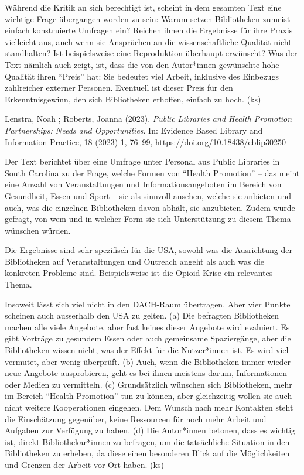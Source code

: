 \documentclass[a4paper,
fontsize=11pt,
oneside,
numbers=noperiodatend,
parskip=half-,
bibliography=totoc,
final
]{scrartcl}
\begin{document}
Während die Kritik an sich berechtigt ist, scheint in dem gesamten Text
eine wichtige Frage übergangen worden zu sein: Warum setzen Bibliotheken
zumeist einfach konstruierte Umfragen ein? Reichen ihnen die Ergebnisse
für ihre Praxis vielleicht aus, auch wenn sie Ansprüchen an die
wissenschaftliche Qualität nicht standhalten? Ist beispielsweise eine
Reproduktion überhaupt erwünscht? Was der Text nämlich auch zeigt, ist,
dass die von den Autor*innen gewünschte hohe Qualität ihren
\enquote{Preis} hat: Sie bedeutet viel Arbeit, inklusive des Einbezugs
zahlreicher externer Personen. Eventuell ist dieser Preis für den
Erkenntnisgewinn, den sich Bibliotheken erhoffen, einfach zu hoch. (ks)

Lenstra, Noah ; Roberts, Joanna (2023). \emph{Public Libraries and
Health Promotion Partnerships: Needs and Opportunities}. In: Evidence
Based Library and Information Practice, 18 (2023) 1, 76--99,
\url{https://doi.org/10.18438/eblip30250}

Der Text berichtet über eine Umfrage unter Personal aus Public Libraries
in South Carolina zu der Frage, welche Formen von \enquote{Health
Promotion} -- das meint eine Anzahl von Veranstaltungen und
Informationsangeboten im Bereich von Gesundheit, Essen und Sport -- sie
als sinnvoll ansehen, welche sie anbieten und auch, was die einzelnen
Bibliotheken davon abhält, sie anzubieten. Zudem wurde gefragt, von wem
und in welcher Form sie sich Unterstützung zu diesem Thema wünschen
würden.

Die Ergebnisse sind sehr spezifisch für die USA, sowohl was die
Ausrichtung der Bibliotheken auf Veranstaltungen und Outreach angeht als
auch was die konkreten Probleme sind. Beispielsweise ist die
Opioid-Krise ein relevantes Thema.

Insoweit lässt sich viel nicht in den DACH-Raum übertragen. Aber vier
Punkte scheinen auch ausserhalb den USA zu gelten. (a) Die befragten
Bibliotheken machen alle viele Angebote, aber fast keines dieser
Angebote wird evaluiert. Es gibt Vorträge zu gesundem Essen oder auch
gemeinsame Spaziergänge, aber die Bibliotheken wissen nicht, was der
Effekt für die Nutzer*innen ist. Es wird viel vermutet, aber wenig
überprüft. (b) Auch, wenn die Bibliotheken immer wieder neue Angebote
ausprobieren, geht es bei ihnen meistens darum, Informationen oder
Medien zu vermitteln. (c) Grundsätzlich wünschen sich Bibliotheken, mehr
im Bereich \enquote{Health Promotion} tun zu können, aber gleichzeitig
wollen sie auch nicht weitere Kooperationen eingehen. Dem Wunsch nach
mehr Kontakten steht die Einschätzung gegenüber, keine Ressourcen für
noch mehr Arbeit und Aufgaben zur Verfügung zu haben. (d) Die
Autor*innen betonen, dass es wichtig ist, direkt Bibliothekar*innen zu
befragen, um die tatsächliche Situation in den Bibliotheken zu erheben,
da diese einen besonderen Blick auf die Möglichkeiten und Grenzen der
Arbeit vor Ort haben. (ks)
\end{document}
